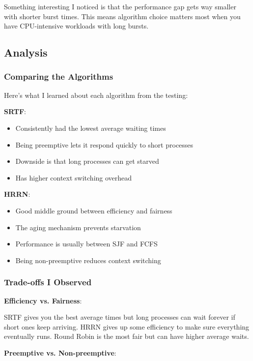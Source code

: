 \documentclass[12pt,letterpaper]{article}
\begin{document}
Something interesting I noticed is that the performance gap gets way smaller with 
shorter burst times. This means algorithm choice matters most when you have 
CPU-intensive workloads with long bursts.

\newpage

\subsection{Analysis}

\subsubsection{Comparing the Algorithms}

Here's what I learned about each algorithm from the testing:

\textbf{SRTF}:
\begin{itemize}
    \item Consistently had the lowest average waiting times
    \item Being preemptive lets it respond quickly to short processes
    \item Downside is that long processes can get starved
    \item Has higher context switching overhead
\end{itemize}

\textbf{HRRN}:
\begin{itemize}
    \item Good middle ground between efficiency and fairness
    \item The aging mechanism prevents starvation
    \item Performance is usually between SJF and FCFS
    \item Being non-preemptive reduces context switching
\end{itemize}

\subsubsection{Trade-offs I Observed}

\textbf{Efficiency vs. Fairness}:

SRTF gives you the best average times but long processes can wait forever if 
short ones keep arriving. HRRN gives up some efficiency to make sure everything 
eventually runs. Round Robin is the most fair but can have higher average waits.

\textbf{Preemptive vs. Non-preemptive}:
\end{document}
